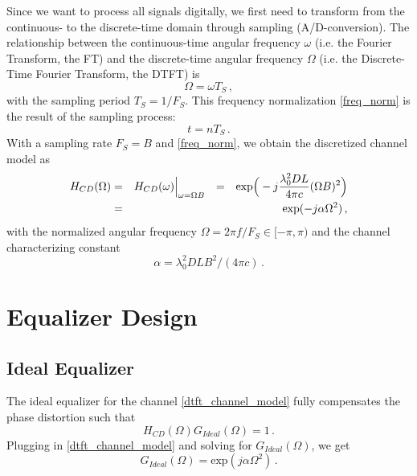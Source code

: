 \documentclass[paper=a4, fontsize=11pt]{scrartcl} %
\numberwithin{equation}{section} %
\numberwithin{figure}{section} %
\numberwithin{table}{section} %
\begin{document}
Since we want to process all signals digitally, we first need to transform from the continuous- to the discrete-time domain through sampling (A/D-conversion). The relationship between the continuous-time angular frequency $\omega$ (i.e. the Fourier Transform, the FT) and the discrete-time angular frequency $\Omega$ (i.e. the Discrete-Time Fourier Transform, the DTFT) is
\begin{equation} 
\Omega=\omega T_S\label{freq_norm}\, ,
\end{equation}
with the sampling period $T_S=1/F_S$. This frequency normalization \eqref{freq_norm} is the result of the sampling process:
\begin{equation} 
t=nT_S\label{time_norm}\, .
\end{equation}
With a sampling rate $F_S=B$ and \eqref{freq_norm}, we obtain the discretized channel model as
\begin{eqnarray} 
H_{CD}(\Omega)&=&H_{CD}(\omega)\Big|_{\omega=\Omega B}\hspace{0.25cm}=\hspace{0.25cm}\text{exp}\Big(-j\frac{\lambda_{0}^{2}DL}{4\pi c}(\Omega B)^2\Big)\nonumber\\
&=&\text{exp}(-j\alpha\Omega^2)\label{dtft_channel_model} \, ,
\end{eqnarray}
with the normalized angular frequency $\Omega=2\pi f/F_S \in [-\pi,\pi)$ and the channel characterizing constant
\begin{equation} 
\alpha=\lambda_{0}^{2}DLB^2/(4\pi c)\label{alpha}\, .
\end{equation}


\section{Equalizer Design}

\subsection{Ideal Equalizer}

The ideal equalizer for the channel \eqref{dtft_channel_model} fully compensates the phase distortion such that
\begin{equation} 
H_{CD}(\Omega)G_{Ideal}(\Omega)=1\label{ideal_relation}\, .
\end{equation}
Plugging in \eqref{dtft_channel_model} and solving for $G_{Ideal}(\Omega)$, we get
\begin{equation} 
G_{Ideal}(\Omega)=\text{exp}(j\alpha\Omega^2)\label{ideal_eq}\, .
\end{equation}
\end{document}
